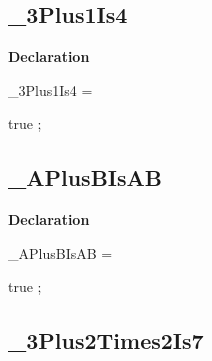 \documentclass{report}
\newif\ifpdf
\begin{document}
\subsection*{{\_}3Plus1Is4}
\fi
\label{ok_if_expressions_2-_3Plus1Is4}
\begin{list}{}{
\setlength{\itemindent}{0cm}
\setlength{\listparindent}{0cm}
\setlength{\leftmargin}{\evensidemargin}
\addtolength{\leftmargin}{\tmplength}
\settowidth{\labelsep}{X}
\addtolength{\leftmargin}{\labelsep}
\setlength{\labelwidth}{\tmplength}
}
\item[\textbf{Declaration}\hfill]
\ifpdf
\begin{flushleft}
\fi
\begin{ttfamily}
{\_}3Plus1Is4 =

true
;\end{ttfamily}

\ifpdf
\end{flushleft}
\fi

\end{list}
\ifpdf
\subsection*{\large{\textbf{{\_}APlusBIsAB}}\normalsize\hspace{1ex}\hrulefill}
\else
\subsection*{{\_}APlusBIsAB}
\fi
\label{ok_if_expressions_2-_APlusBIsAB}
\begin{list}{}{
\setlength{\itemindent}{0cm}
\setlength{\listparindent}{0cm}
\setlength{\leftmargin}{\evensidemargin}
\addtolength{\leftmargin}{\tmplength}
\settowidth{\labelsep}{X}
\addtolength{\leftmargin}{\labelsep}
\setlength{\labelwidth}{\tmplength}
}
\item[\textbf{Declaration}\hfill]
\ifpdf
\begin{flushleft}
\fi
\begin{ttfamily}
{\_}APlusBIsAB =

true
;\end{ttfamily}

\ifpdf
\end{flushleft}
\fi

\end{list}
\ifpdf
\subsection*{\large{\textbf{{\_}3Plus2Times2Is7}}\normalsize\hspace{1ex}\hrulefill}
\else
\end{document}
